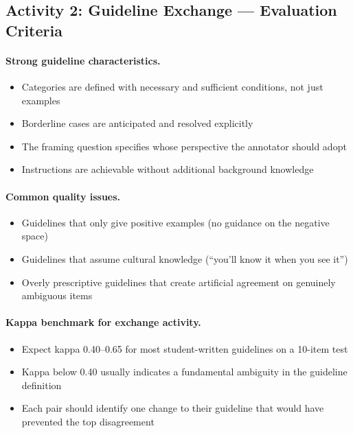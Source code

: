 \subsection{Activity 2: Guideline Exchange --- Evaluation Criteria}

\paragraph{Strong guideline characteristics.}
\begin{itemize}
    \item Categories are defined with necessary and sufficient conditions, not just examples
    \item Borderline cases are anticipated and resolved explicitly
    \item The framing question specifies whose perspective the annotator should adopt
    \item Instructions are achievable without additional background knowledge
\end{itemize}

\paragraph{Common quality issues.}
\begin{itemize}
    \item Guidelines that only give positive examples (no guidance on the negative space)
    \item Guidelines that assume cultural knowledge (``you'll know it when you see it'')
    \item Overly prescriptive guidelines that create artificial agreement on genuinely ambiguous items
\end{itemize}

\paragraph{Kappa benchmark for exchange activity.}
\begin{itemize}
    \item Expect kappa 0.40--0.65 for most student-written guidelines on a 10-item test
    \item Kappa below 0.40 usually indicates a fundamental ambiguity in the guideline definition
    \item Each pair should identify one change to their guideline that would have prevented the top disagreement
\end{itemize}

